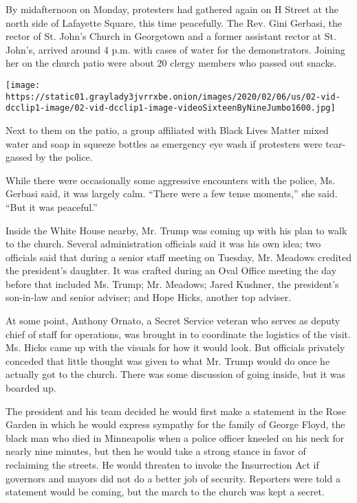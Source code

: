 By midafternoon on Monday, protesters had gathered again on H Street at
the north side of Lafayette Square, this time peacefully. The Rev. Gini
Gerbasi, the rector of St. John's Church in Georgetown and a former
assistant rector at St. John's, arrived around 4 p.m. with cases of
water for the demonstrators. Joining her on the church patio were about
20 clergy members who passed out snacks.

\texttt{[image: https://static01.graylady3jvrrxbe.onion/images/2020/02/06/us/02-vid-dcclip1-image/02-vid-dcclip1-image-videoSixteenByNineJumbo1600.jpg]}

Next to them on the patio, a group affiliated with Black Lives Matter
mixed water and soap in squeeze bottles as emergency eye wash if
protesters were tear-gassed by the police.

While there were occasionally some aggressive encounters with the
police, Ms. Gerbasi said, it was largely calm. ``There were a few tense
moments,'' she said. ``But it was peaceful.''

Inside the White House nearby, Mr. Trump was coming up with his plan to
walk to the church. Several administration officials said it was his own
idea; two officials said that during a senior staff meeting on Tuesday,
Mr. Meadows credited the president's daughter. It was crafted during an
Oval Office meeting the day before that included Ms. Trump; Mr. Meadows;
Jared Kushner, the president's son-in-law and senior adviser; and Hope
Hicks, another top adviser.

At some point, Anthony Ornato, a Secret Service veteran who serves as
deputy chief of staff for operations, was brought in to coordinate the
logistics of the visit. Ms. Hicks came up with the visuals for how it
would look. But officials privately conceded that little thought was
given to what Mr. Trump would do once he actually got to the church.
There was some discussion of going inside, but it was boarded up.

The president and his team decided he would first make a statement in
the Rose Garden in which he would express sympathy for the family of
George Floyd, the black man who died in Minneapolis when a police
officer kneeled on his neck for nearly nine minutes, but then he would
take a strong stance in favor of reclaiming the streets. He would
threaten to invoke the Insurrection Act if governors and mayors did not
do a better job of security. Reporters were told a statement would be
coming, but the march to the church was kept a secret.


